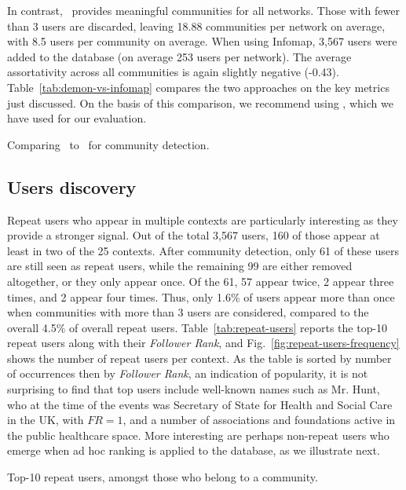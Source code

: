 In contrast, \infomap~provides meaningful communities for all networks.
Those with fewer than 3 users are discarded, leaving  18.88 communities per network on average, with 8.5 users per community on average.
When using Infomap, 3,567 users were added to the database (on average 253 users per network).
The average assortativity across all communities is again slightly negative (-0.43).
%
Table~\ref{tab:demon-vs-infomap} compares the two approaches on the key metrics just discussed. On the basis of this comparison, we recommend using \infomap, which we have used for  our evaluation.

\begin{table}
	\vspace{-10pt}
		\footnotesize
	\resizebox{\textwidth}{!}{
	    
	}
	\caption{Comparing \demon~to \infomap~for community detection.}
	\label{tab:demon-vs-infomap}
	\vspace{-20pt}
\end{table}

\subsection{Users discovery}  \label{sec:users}

Repeat users who appear in multiple contexts are particularly interesting as they provide a stronger signal. 
Out of the total 3,567 users, 160 of those appear at least in two of the 25 contexts.
After community detection, only 61 of these users are still seen as repeat users,
while the remaining 99 are either removed altogether, or they only appear once.
Of the 61, 57 appear twice, 2 appear three times, and 2 appear four times. 
Thus, only 1.6\% of users appear more than once when communities with more than 3 users are considered, compared to the overall 4.5\% of overall repeat users.
%
Table~\ref{tab:repeat-users} reports the top-10 repeat users along with their \textit{Follower Rank}, and Fig.~\ref{fig:repeat-users-frequency} shows the number of repeat users per context.
As the table is sorted by number of occurrences then by \textit{Follower Rank}, an indication of popularity,  it is not surprising to find that top users include well-known names such as Mr. Hunt, who at the time of the events was Secretary of State for Health and Social Care in the UK, with $FR =1$, and a number of associations and foundations active in the public healthcare space.
More interesting are perhaps non-repeat users who emerge when ad hoc ranking is applied to the database, as we illustrate next.
\vspace{-10pt}
\begin{table}[htb]
	\centering
	\footnotesize
	\resizebox{\textwidth}{!}{
		
	}
	\caption{Top-10 repeat users, amongst those who belong to a community.}
	\label{tab:repeat-users}
	\vspace{-20pt}
\end{table}

